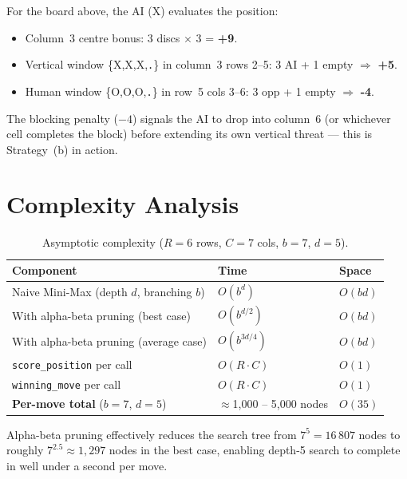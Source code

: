 \documentclass[12pt]{article}
\begin{document}
For the board above, the AI (X) evaluates the position:

\begin{itemize}
    \item Column~3 centre bonus: 3 discs $\times$ 3 = \textbf{+9}.
    \item Vertical window \{X,X,X,\texttt{.}\} in column~3 rows 2--5:
          3 AI + 1 empty $\Rightarrow$ \textbf{+5}.
    \item Human window \{O,O,O,\texttt{.}\} in row~5 cols 3--6:
          3 opp + 1 empty $\Rightarrow$ \textbf{-4}.
\end{itemize}

The blocking penalty ($-4$) signals the AI to drop into column~6
(or whichever cell completes the block) before extending its own vertical
threat --- this is Strategy~(b) in action.

\section{Complexity Analysis}

\begin{table}[H]
\centering
\begin{tabular}{@{} l l l @{}}
\toprule
\textbf{Component} & \textbf{Time} & \textbf{Space} \\
\midrule
Naive Mini-Max (depth $d$, branching $b$)  & $O(b^d)$        & $O(bd)$ \\
With alpha-beta pruning (best case)        & $O(b^{d/2})$    & $O(bd)$ \\
With alpha-beta pruning (average case)     & $O(b^{3d/4})$   & $O(bd)$ \\
\texttt{score\_position} per call          & $O(R \cdot C)$  & $O(1)$  \\
\texttt{winning\_move} per call            & $O(R \cdot C)$  & $O(1)$  \\
\midrule
\textbf{Per-move total} ($b=7$, $d=5$)    & $\approx$1,000 -- 5,000 nodes & $O(35)$ \\
\bottomrule
\end{tabular}
\caption{Asymptotic complexity ($R=6$ rows, $C=7$ cols, $b=7$, $d=5$).}
\end{table}

Alpha-beta pruning effectively reduces the search tree from $7^5 = 16\,807$
nodes to roughly $7^{2.5} \approx 1{,}297$ nodes in the best case, enabling
depth-5 search to complete in well under a second per move.
\end{document}
